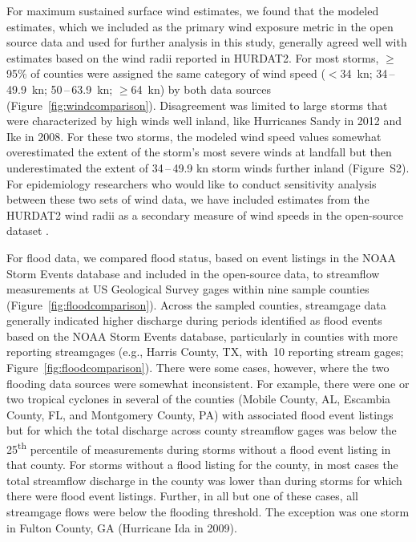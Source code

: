 For maximum sustained surface wind estimates, we found that the modeled
estimates, which we included as the primary wind exposure metric in the open
source data and used for further analysis in this study, generally agreed well
with estimates based on the wind radii reported in \ac{HURDAT2}. For most
storms, $\ge$95\% of counties were assigned the same category of wind speed
($<$34~\si{\knot}; 34\,--\,49.9~\si{\knot}; 50\,--\,63.9~\si{\knot};
$\ge$64~\si{\knot}) by both data sources (Figure~\ref{fig:windcomparison}).
Disagreement was limited to large storms that were characterized by high winds
well inland, like Hurricanes Sandy in 2012 and Ike in 2008. For these two
storms, the modeled wind speed values somewhat overestimated the extent of the
storm's most severe winds at landfall but then underestimated the extent of
34\,--\,49.9 \si{\knot} storm winds further inland (Figure~S2). For
epidemiology researchers who would like to conduct sensitivity analysis
between these two sets of wind data, we have included estimates from the
\ac{HURDAT2} wind radii as a secondary measure of wind speeds in the
open-source dataset \parencite{hurricaneexposuredata}.

For flood data, we compared flood status, based on event listings in the NOAA
Storm Events database and included in the open-source data, to streamflow
measurements at \ac{US} Geological Survey gages within nine sample counties
(Figure~\ref{fig:floodcomparison}). Across the sampled counties, streamgage
data generally indicated higher discharge during periods identified as flood
events based on the NOAA Storm Events database, particularly in counties with
more reporting streamgages (e.g., Harris County, TX, with~10 reporting stream
gages; Figure~\ref{fig:floodcomparison}). There were some cases, however, where
the two flooding data sources were somewhat inconsistent.  For example, there
were one or two tropical cyclones in several of the counties (Mobile County,
AL, Escambia County, FL, and Montgomery County, PA) with associated flood event
listings but for which the total discharge across county streamflow gages was
below the 25\textsuperscript{th} percentile of measurements during storms
without a flood event listing in that county. For storms without a flood
listing for the county, in most cases the total streamflow discharge in
the county was lower than during storms for which there were flood
event listings. Further, in all but one of these cases, all streamgage flows
were below the flooding threshold. The exception was one storm in Fulton
County, GA (Hurricane Ida in 2009). 

